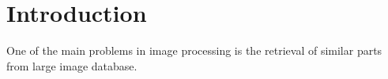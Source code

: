 \chapter{Introduction}

One of the main problems in image processing is the retrieval of similar parts from large image database. 